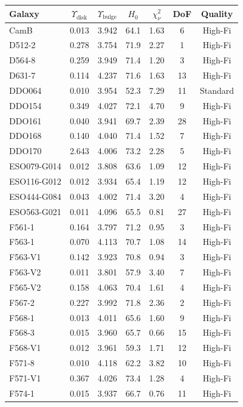 \begin{longtable}{lcccccc}
\toprule
Galaxy & $\Upsilon_{\text{disk}}$ & $\Upsilon_{\text{bulge}}$ & $H_0$ & $\chi^2_\nu$ & DoF & Quality \\
\midrule
CamB & 0.013 & 3.942 & 64.1 & 1.63 & 6 & High-Fi \\
D512-2 & 0.278 & 3.754 & 71.9 & 2.27 & 1 & High-Fi \\
D564-8 & 0.259 & 3.949 & 71.4 & 1.20 & 3 & High-Fi \\
D631-7 & 0.114 & 4.237 & 71.6 & 1.63 & 13 & High-Fi \\
DDO064 & 0.010 & 3.954 & 52.3 & 7.29 & 11 & Standard \\
DDO154 & 0.349 & 4.027 & 72.1 & 4.70 & 9 & High-Fi \\
DDO161 & 0.040 & 3.941 & 69.7 & 2.39 & 28 & High-Fi \\
DDO168 & 0.140 & 4.040 & 71.4 & 1.52 & 7 & High-Fi \\
DDO170 & 2.643 & 4.006 & 73.2 & 2.28 & 5 & High-Fi \\
ESO079-G014 & 0.012 & 3.808 & 63.6 & 1.09 & 12 & High-Fi \\
ESO116-G012 & 0.012 & 3.934 & 65.4 & 1.19 & 12 & High-Fi \\
ESO444-G084 & 0.043 & 4.002 & 71.4 & 3.20 & 4 & High-Fi \\
ESO563-G021 & 0.011 & 4.096 & 65.5 & 0.81 & 27 & High-Fi \\
F561-1 & 0.164 & 3.797 & 71.2 & 0.95 & 3 & High-Fi \\
F563-1 & 0.070 & 4.113 & 70.7 & 1.08 & 14 & High-Fi \\
F563-V1 & 0.142 & 3.923 & 70.8 & 0.94 & 3 & High-Fi \\
F563-V2 & 0.011 & 3.801 & 57.9 & 3.40 & 7 & High-Fi \\
F565-V2 & 0.158 & 4.063 & 70.4 & 1.61 & 4 & High-Fi \\
F567-2 & 0.227 & 3.992 & 71.8 & 2.36 & 2 & High-Fi \\
F568-1 & 0.013 & 4.011 & 65.6 & 1.60 & 9 & High-Fi \\
F568-3 & 0.015 & 3.960 & 65.7 & 0.66 & 15 & High-Fi \\
F568-V1 & 0.012 & 3.961 & 59.3 & 1.71 & 12 & High-Fi \\
F571-8 & 0.010 & 4.118 & 62.2 & 3.82 & 10 & High-Fi \\
F571-V1 & 0.367 & 4.026 & 73.4 & 1.28 & 4 & High-Fi \\
F574-1 & 0.015 & 3.937 & 66.7 & 0.76 & 11 & High-Fi \\

\end{longtable}
